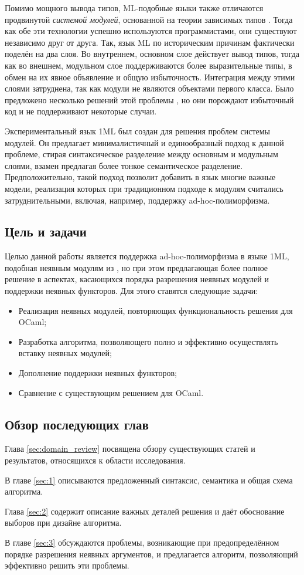 \documentclass[../diploma.tex]{subfiles}
\begin{document}
Помимо мощного вывода типов, ML-подобные языки также отличаются продвинутой \textit{системой модулей}, основанной на теории зависимых типов \cite{dependent_types}. Тогда как обе эти технологии успешно используются программистами, они существуют независимо друг от друга. Так, язык ML по историческим причинам фактически поделён на два слоя. Во внутреннем, основном слое действует вывод типов, тогда как во внешнем, модульном слое поддерживаются более выразительные типы, в обмен на их явное объявление и общую избыточность. Интеграция между этими слоями затруднена, так как модули не являются объектами первого класса. Было предложено несколько решений этой проблемы \cite{packaged} \cite{aliceml} \cite{packaged_ocaml}, но они порождают избыточный код и не поддерживают некоторые случаи.

Экспериментальный язык 1ML \cite{1ml} был создан для решения проблем системы модулей. Он предлагает минималистичный и единообразный подход к данной проблеме, стирая синтаксическое разделение между основным и модульным слоями, взамен предлагая более тонкое семантическое разделение. Предположительно, такой подход позволит добавить в язык многие важные модели, реализация которых при традиционном подходе к модулям считались затруднительными, включая, например, поддержку ad-hoc-полиморфизма.

\subsection*{Цель и задачи}

Целью данной работы является поддержка ad-hoc-полиморфизма в языке 1ML, подобная неявным модулям из \cite{white}, но при этом предлагающая более полное решение в аспектах, касающихся порядка разрешения неявных модулей и поддержки неявных функторов. Для этого ставятся следующие задачи:

\begin{itemize}
	\item Реализация неявных модулей, повторяющих функциональность решения \cite{white} для OCaml;
	\item Разработка алгоритма, позволяющего полно и эффективно осуществлять вставку неявных модулей;
	\item Дополнение поддержки неявных функторов;
	\item Сравнение с существующим решением \cite{white} для OCaml.
\end{itemize}

\subsection*{Обзор последующих глав}

Глава \ref{sec:domain_review} посвящена обзору существующих статей и результатов, относящихся к области исследования. 

В главе \ref{sec:1} описываются предложенный синтаксис, семантика и общая схема алгоритма.

Глава \ref{sec:2} содержит описание важных деталей решения и даёт обоснование выборов при дизайне алгоритма.

В главе \ref{sec:3} обсуждаются проблемы, возникающие при предопределённом порядке разрешения неявных аргументов, и предлагается алгоритм, позволяющий эффективно решить эти проблемы.
\end{document}
